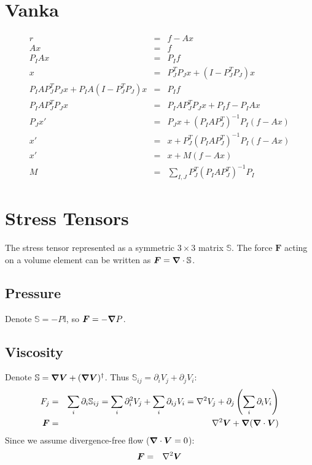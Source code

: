\section{Vanka}
\begin{eqnarray}
 r &=& f - Ax \\
 Ax &=& f \\
 P_I A x &=& P_I f \\
 x &=& P_J^T P_J x + (I - P_J^T P_J) x \\
 P_I A P_J^T P_J x + P_I A  (I - P_J^T P_J) x &=& P_I f \\
 P_I A P_J^T P_J x &=& P_I A  P_J^T P_J x + P_I f - P_I A x \\
 P_J x' &=& P_J x + (P_I A P_J^T)^{-1} P_I (f - Ax) \\
 x' &=& x + P_J^T (P_I A P_J^T)^{-1} P_I (f - Ax) \\
 x' &=& x + M (f - Ax) \\
 M &=& \sum_{I,J} P_J^T (P_I A P_J^T)^{-1} P_I
\end{eqnarray}

\section{Stress Tensors}
The stress tensor represented as a symmetric $3 \times 3$ matrix $\mathbb{S}$.
The force $\boldsymbol{F}$ acting on a volume element can be written as $\boldsymbol{F} = \boldsymbol{\nabla} \cdot \mathbb{S}$.

\subsection{Pressure}
Denote $\mathbb{S} = -P \mathbb{I}$, so $\boldsymbol{F} = -\boldsymbol{\nabla} P$.

\subsection{Viscosity}
Denote $\mathbb{S} = \boldsymbol{\nabla} \boldsymbol{V} + (\boldsymbol{\nabla} \boldsymbol{V})^\dagger$.
Thus $\mathbb{S}_{ij} = \partial_i V_j + \partial_j V_i$:
\begin{eqnarray}
F_j &=& \sum_i \partial_i \mathbb{S}_{ij} = \sum_i \partial^2_i V_j + \sum_i \partial_{ij} V_i
= \nabla^2 V_j + \partial_j \left(\sum_i \partial_i V_i\right) \\
\boldsymbol{F} &=& \nabla^2 \boldsymbol{V} + \boldsymbol{\nabla} (\boldsymbol{\nabla} \cdot \boldsymbol{V})
\end{eqnarray}
Since we assume divergence-free flow ($\boldsymbol{\nabla} \cdot \boldsymbol{V} = 0$):
\begin{eqnarray}
\boldsymbol{F} &=& \nabla^2 \boldsymbol{V}
\end{eqnarray}
